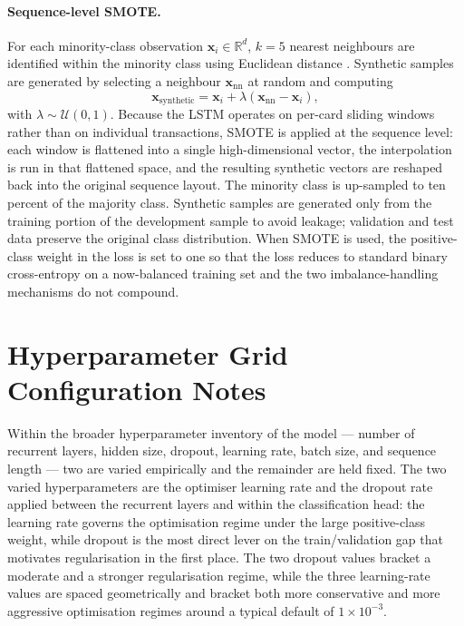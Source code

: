 \documentclass[oneside,12pt,parskip=half,american,numbers=noenddot]{scrreprt}
\begin{document}
\paragraph{Sequence-level SMOTE.} For each minority-class observation $\mathbf{x}_i \in \mathbb{R}^d$, $k = 5$ nearest neighbours are identified within the minority class using Euclidean distance \parencite{chawla_smote_2002}. Synthetic samples are generated by selecting a neighbour $\mathbf{x}_{\text{nn}}$ at random and computing
\[
\mathbf{x}_{\text{synthetic}} = \mathbf{x}_i + \lambda \left( \mathbf{x}_{\text{nn}} - \mathbf{x}_i \right),
\]
with $\lambda \sim \mathcal{U}(0,1)$. Because the LSTM operates on per-card sliding windows rather than on individual transactions, SMOTE is applied at the sequence level: each window is flattened into a single high-dimensional vector, the interpolation is run in that flattened space, and the resulting synthetic vectors are reshaped back into the original sequence layout. The minority class is up-sampled to ten percent of the majority class. Synthetic samples are generated only from the training portion of the development sample to avoid leakage; validation and test data preserve the original class distribution. When SMOTE is used, the positive-class weight in the loss is set to one so that the loss reduces to standard binary cross-entropy on a now-balanced training set and the two imbalance-handling mechanisms do not compound.


\section{Hyperparameter Grid Configuration Notes}
\label{app:hp_grid}

Within the broader hyperparameter inventory of the model — number of recurrent layers, hidden size, dropout, learning rate, batch size, and sequence length — two are varied empirically and the remainder are held fixed. The two varied hyperparameters are the optimiser learning rate and the dropout rate applied between the recurrent layers and within the classification head: the learning rate governs the optimisation regime under the large positive-class weight, while dropout is the most direct lever on the train/validation gap that motivates regularisation in the first place. The two dropout values bracket a moderate and a stronger regularisation regime, while the three learning-rate values are spaced geometrically and bracket both more conservative and more aggressive optimisation regimes around a typical default of $1\times 10^{-3}$.
\end{document}
